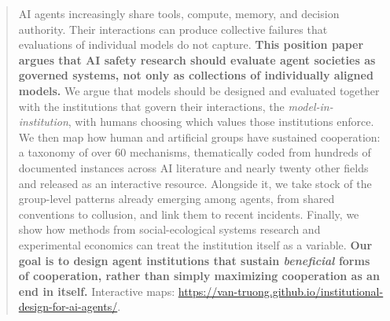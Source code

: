 \documentclass[runningheads]{llncs}
\begin{document}
\newcommand{\REVIEWFLAG}[1]{\ifshowreviewflags{\color{red!75!black}#1}\else#1\fi}
\newcommand{\vqt}[1]{\ifshowreviewflags{{\color{blue}#1}}\else#1\fi}
\newcommand{\dup}[1]{\ifshowreviewflags\hl{#1}\else#1\fi}
\newcommand{\chg}[1]{\ifshowreviewflags{\begingroup\sethlcolor{chgblue}\hl{#1}\endgroup}\else#1\fi}
\newcommand{\rework}[1]{\ifshowreviewflags{\begingroup\sethlcolor{reworkpink}\hl{#1}\endgroup}\else#1\fi}
\newcommand{\fixed}[1]{\ifshowreviewflags{\begingroup\sethlcolor{fixgreen}\hl{#1}\endgroup}\else#1\fi}
\newcommand{\voice}[1]{\ifshowreviewflags{\begingroup\sethlcolor{yellow}\hl{#1}\endgroup}\else#1\fi}
\newcommand{\aiflag}[1]{\ifshowreviewflags{\begingroup\sethlcolor{aiorange}\hl{#1}\endgroup}\else#1\fi}
\newcommand{\del}[1]{\ifshowreviewflags{\color{red!70!black}\setstcolor{red!70!black}\st{#1}}\fi}
\newcommand{\delbanner}[1]{\par\noindent{\color{red!70!black}\textbf{[DELETE: #1]}}\par}

\begin{abstract}
AI agents increasingly share tools, compute, memory, and decision authority. Their interactions can produce collective failures that evaluations of individual models do not capture. 
\textbf{This position paper argues that AI safety research should evaluate agent societies as governed systems, not only as collections of individually aligned models.}
We argue that models should be designed and evaluated together with the institutions that govern their interactions, the \emph{model-in-institution}, with humans choosing which values those institutions enforce. We then map how human and artificial groups have sustained cooperation: a taxonomy of over 60 mechanisms, thematically coded from hundreds of documented instances across AI literature and nearly twenty other fields and released as an interactive resource. Alongside it, we take stock of the group-level patterns already emerging among agents, from shared conventions to collusion, and link them to recent incidents. Finally, we show how methods from social-ecological systems research and experimental economics can treat the institution itself as a variable.
\textbf{Our goal is to design agent institutions that sustain \emph{beneficial} forms of cooperation, rather than simply maximizing cooperation as an end in itself.}
Interactive maps: \url{https://van-truong.github.io/institutional-design-for-ai-agents/}.


\end{abstract}
\end{document}
